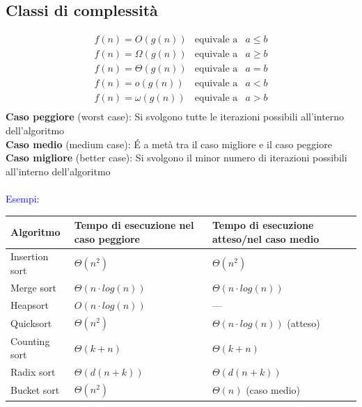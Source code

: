 \documentclass[12pt,a4paper]{article}
\begin{document}
\subsection{Classi di complessità}
\begin{equation*}
\begin{array}{lll}
f(n)=O(g(n)) & \text{equivale a} & a \leq b\\
f(n)=\Omega(g(n)) & \text{equivale a} & a \geq b\\
f(n)=\Theta(g(n)) & \text{equivale a} & a = b\\
f(n)=o(g(n)) & \text{equivale a} & a < b\\
f(n)=\omega(g(n)) & \text{equivale a} & a > b\\
\end{array}
\end{equation*}
\textbf{Caso peggiore} (worst case): Si svolgono tutte le iterazioni possibili all'interno dell'algoritmo\\
\textbf{Caso medio} (medium case): \'E a metà tra il caso migliore e il caso peggiore\\
\textbf{Caso migliore} (better case): Si svolgono il minor numero di iterazioni possibili all'interno dell'algoritmo\\
\\
\textcolor{blue}{Esempi}:
\begin{center}
\begin{tabular}{l|ll}
Algoritmo & Tempo di esecuzione nel caso peggiore & Tempo di esecuzione atteso/nel caso medio\\ \hline
Insertion sort & $\Theta(n^2)$ & $\Theta(n^2)$\\
Merge sort & $\Theta(n\cdot log(n))$ &  $\Theta(n\cdot log(n))$\\
Heapsort &  $O(n\cdot log(n))$ & ---\\
Quicksort & $\Theta(n^2)$ & $\Theta(n\cdot log(n))$ (atteso)\\
Counting sort & $\Theta(k+n)$ & $\Theta(k+n)$\\
Radix sort & $\Theta(d(n+k))$ & $\Theta(d(n+k))$\\
Bucket sort & $\Theta(n^2)$ & $\Theta(n)$ (caso medio)
\end{tabular}
\end{center}

\clearpage
\end{document}
